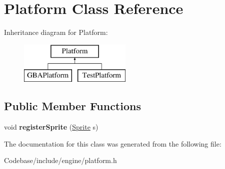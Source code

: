 \hypertarget{class_platform}{\section{Platform Class Reference}
\label{class_platform}
}
Inheritance diagram for Platform\-:\begin{figure}[H]
\begin{center}
\leavevmode
\includegraphics[height=2.000000cm]{class_platform}
\end{center}
\end{figure}
\subsection*{Public Member Functions}
\begin{DoxyCompactItemize}
\item 
\hypertarget{class_platform_ae1ce123f017fbf5949220a295320e11c}{void {\bfseries register\-Sprite} (\hyperlink{class_sprite}{Sprite} s)}\label{class_platform_ae1ce123f017fbf5949220a295320e11c}

\end{DoxyCompactItemize}


The documentation for this class was generated from the following file\-:\begin{DoxyCompactItemize}
\item 
Codebase/include/engine/platform.\-h\end{DoxyCompactItemize}
